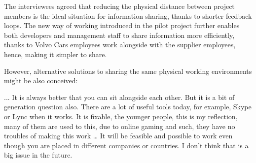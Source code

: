  The interviewees agreed that reducing the physical distance between project members is the ideal situation for information sharing, thanks to shorter feedback loops. The new way of working introduced in the pilot project further enables both developers and management staff to share information more efficiently, thanks to Volvo Cars employees work alongside with the supplier employees, hence, making it simpler to share. 

However, alternative solutions to sharing the same physical working environments might be also conceived:

\begin{aquote}{...}
It is always better that you can sit alongside each other. But it is a bit of generation question also. There are a lot of useful tools today, for example, Skype or Lync when it works. It is fixable, the younger people, this is my reflection, many of them are used to this, due to online gaming and such, they have no troubles of making this work … It will be feasible and possible to work even though you are placed in different companies or countries. I don't think that is a big issue in the future.
\end{aquote}



%
%
%
%

